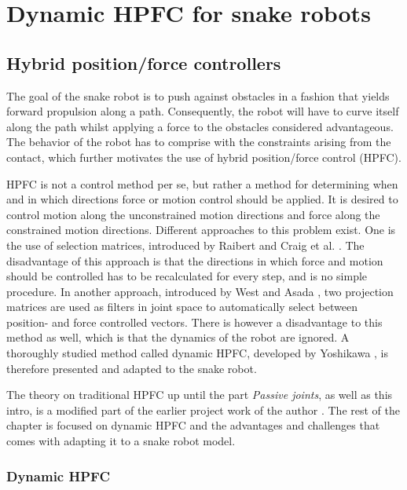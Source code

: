 \chapter{Dynamic HPFC for snake robots}\label{ch:hpfc}

\section{Hybrid position/force controllers}

The goal of the snake robot is to push against obstacles in a fashion that yields forward propulsion along a path. Consequently, the robot will have to curve itself along the path whilst applying a force to the obstacles considered advantageous. The behavior of the robot has to comprise with the constraints arising from the contact, which further motivates the use of hybrid position/force control (HPFC).

HPFC is not a control method per se, but rather a method for determining when and in which directions force or motion control should be applied. It is desired to control motion along the unconstrained motion directions and force along the constrained motion directions. Different approaches to this problem exist. One is the use of selection matrices, introduced by Raibert and Craig et al. \cite{raibert1981hybrid}. The disadvantage of this approach is that the directions in which force and motion should be controlled has to be recalculated for every step, and is no simple procedure. In another approach, introduced by West and Asada \cite{west1985method}, two projection matrices are used as filters in joint space to automatically select between position- and force controlled vectors. There is however a disadvantage to this method as well, which is that the dynamics of the robot are ignored. A thoroughly studied method called dynamic HPFC, developed by Yoshikawa \cite{yoshikawa1987dynamic}, is therefore presented and adapted to the snake robot.

The theory on traditional HPFC up until the part \textit{Passive joints}, as well as this intro, is a modified part of the earlier project work of the author \cite{AtussaProsjektoppgp}. The rest of the chapter is focused on dynamic HPFC and the advantages and challenges that comes with adapting it to a snake robot model.



\subsection{Dynamic HPFC} \label{subsec:DHPFC}

